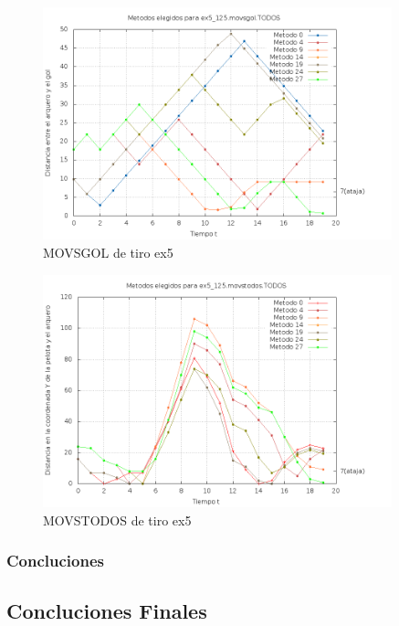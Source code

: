 \begin{figure}[H]
\begin{center}
\includegraphics[width=0.9\textwidth]{img/ex5_125_movsgol_TODOS_elegidos.png}
     \caption{MOVSGOL de tiro ex5}
\end{center}
\end{figure}

\begin{figure}[H]
\begin{center}
\includegraphics[width=0.9\textwidth]{img/ex5_125_movstodos_TODOS_elegidos.png}
     \caption{MOVSTODOS de tiro ex5}
\end{center}
\end{figure}


\subsubsection{Concluciones}

\subsection{Concluciones Finales}

